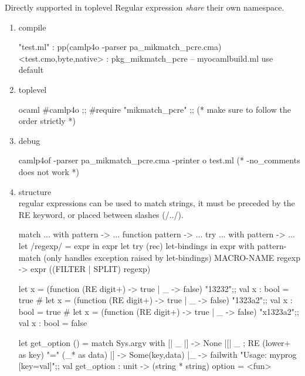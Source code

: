 


Directly supported in toplevel
Regular expression \emph{share} their own namespace.
\begin{enumerate}
\item compile
\begin{bluetext}
"test.ml" : pp(camlp4o -parser pa_mikmatch_pcre.cma)
<test.{cmo,byte,native}> : pkg_mikmatch_pcre
-- myocamlbuild.ml use default 
\end{bluetext}
\item toplevel
\begin{redcode}
ocaml
#camlp4o ;;
#require "mikmatch_pcre" ;; (* make sure to follow the order strictly *)
\end{redcode}
\item debug

  \begin{bluetext}
camlp4of -parser pa_mikmatch_pcre.cma -printer o test.ml
(* -no_comments does not work    *)
\end{bluetext}

\item structure \\
  regular expressions can be used to match strings, it must be preceded by
  the RE keyword, or placed between slashes (/../).

  \begin{bluecode}
    match ... with pattern -> ...
    function pattern -> ...
    try ... with pattern -> ... 
    let /regexp/ = expr in expr
    let try (rec) let-bindings in expr with pattern-match
    (only handles exception raised by let-bindings)
    MACRO-NAME regexp -> expr ((FILTER | SPLIT) regexp)
    
  \end{bluecode}

  \begin{alternate}
let x = (function (RE digit+) -> true | _ -> false) "13232";;
val x : bool = true
# let x = (function (RE digit+) -> true | _ -> false) "1323a2";;
val x : bool = true
# let x = (function (RE digit+) -> true | _ -> false) "x1323a2";;
val x : bool = false    
\end{alternate}

\begin{bluecode}
let get_option () = match Sys.argv with 
     [| _ |] -> None 
    |[| _ ; RE (lower+ as key) "=" (_* as data) |] -> Some(key,data)
    |_ -> failwith "Usage: myprog [key=val]";;
val get_option : unit -> (string * string) option = <fun>
\end{bluecode}


\end{enumerate}
